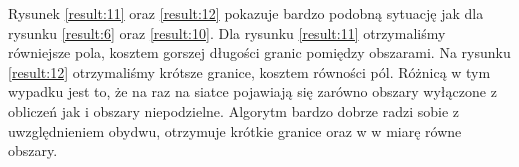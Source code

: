 Rysunek \ref{result:11} oraz \ref{result:12} pokazuje bardzo podobną sytuację jak dla rysunku \ref{result:6} oraz
\ref{result:10}.
Dla rysunku \ref{result:11} otrzymaliśmy równiejsze pola, kosztem gorszej długości granic pomiędzy obszarami.
Na rysunku \ref{result:12} otrzymaliśmy krótsze granice, kosztem równości pól.
Różnicą w tym wypadku jest to, że na raz na siatce pojawiają się zarówno obszary wyłączone z obliczeń jak i
obszary niepodzielne.
Algorytm bardzo dobrze radzi sobie z uwzględnieniem obydwu, otrzymuje krótkie granice oraz w w miarę równe obszary.
\begin{figure}[h]
\centering
\begin{subfigure}{.33\textwidth}
    \centering
    \caption[short]{}
\end{subfigure}%
\begin{subfigure}{.33\textwidth}
    \centering
    \caption[short]{}

\end{subfigure}
\end{figure}
